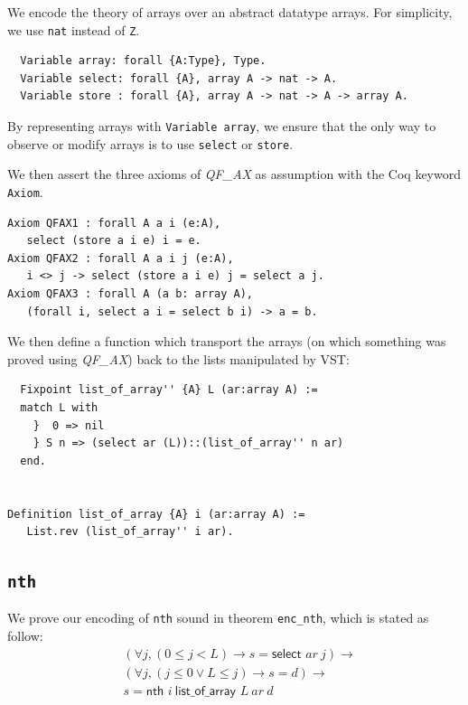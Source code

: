 \documentclass[onecolumn, preprint]{sigplanconf}
\newcommand{\select}[2]{\textsf{select } #1\ #2}
\newcommand{\loa}[2]{\textsf{list\_of\_array } #1\ #2}
\newcommand{\nth}[3]{\textsf{nth } #1\ #2\ #3}
\begin{document}

We encode the theory of arrays over an abstract datatype arrays. For simplicity, we use \texttt{nat} instead of \texttt{Z}.  
\begin{lstlisting}
  Variable array: forall {A:Type}, Type.
  Variable select: forall {A}, array A -> nat -> A.
  Variable store : forall {A}, array A -> nat -> A -> array A.
\end{lstlisting}
By representing arrays with \texttt{Variable array}, we ensure that the only way to observe or modify arrays is to use \texttt{select} or \texttt{store}.

We then assert the three axioms of \emph{QF\_AX} as assumption with the Coq keyword \texttt{Axiom}.

\begin{lstlisting}
Axiom QFAX1 : forall A a i (e:A),
   select (store a i e) i = e.  
Axiom QFAX2 : forall A a i j (e:A),
   i <> j -> select (store a i e) j = select a j.  
Axiom QFAX3 : forall A (a b: array A),
   (forall i, select a i = select b i) -> a = b.  
\end{lstlisting}

We then define a function which transport the arrays (on which something was proved using \emph{QF\_AX}) back to the lists manipulated by VST:

\begin{lstlisting}
  Fixpoint list_of_array'' {A} L (ar:array A) :=
  match L with
    }  0 => nil
    } S n => (select ar (L))::(list_of_array'' n ar)
  end.


Definition list_of_array {A} i (ar:array A) :=
   List.rev (list_of_array'' i ar).
\end{lstlisting}





\subsection{\texttt{nth}}
We prove our encoding of \texttt{nth} sound in theorem \texttt{enc\_nth}, which is stated as follow:
\begin{align*}
 & (\forall j, (0 \leq j < L) \to s = \select{ar}{j}) \to \\
 & (\forall j, (j \leq 0 \vee L \leq j) \to s = d) \to \\
 & s = \nth{i}{\loa{L}{ar}}{d} 
\end{align*}
\end{document}
